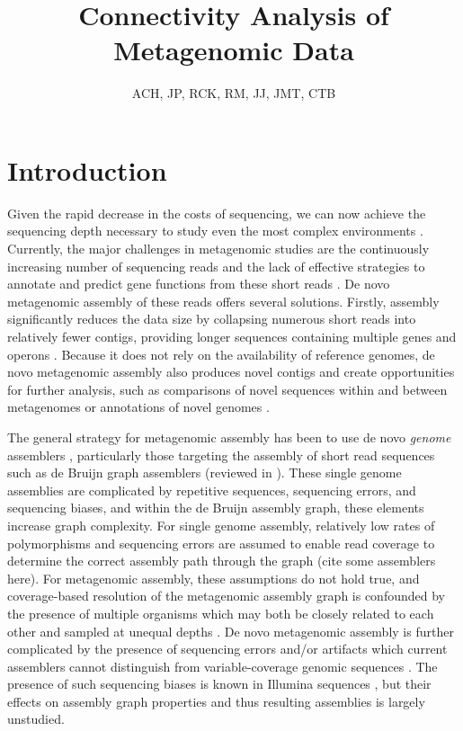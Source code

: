 \documentclass[11pt]{article} %
\begin{document}
\title{Connectivity Analysis of Metagenomic Data}
\author{ACH, JP, RCK, RM, JJ, JMT, CTB}
\maketitle
\section{Introduction}

Given the rapid decrease in the costs of sequencing, we can now achieve the sequencing depth necessary to study even the most complex environments \cite{Hess:2011p686,Qin:2010p189}.  Currently, the major challenges in metagenomic studies are the continuously increasing number of sequencing reads and the lack of effective strategies to annotate and predict gene functions from these short reads \cite{Hoff:2009p913,Kunin:2008p16,Noguchi:2006p968,Zhang:2012p959}.  De novo metagenomic assembly of these reads offers several solutions.  Firstly, assembly significantly reduces the data size by collapsing numerous short reads into relatively fewer contigs, providing longer sequences containing multiple genes and operons \cite{Miller:2010p226,Pop:2009p798}.  Because it does not rely on the availability of reference genomes, de novo metagenomic assembly also produces novel contigs and create opportunities for further analysis, such as comparisons of novel sequences within and between metagenomes \cite{Li:2009p707,Schloss:2008p2} or annotations of novel genomes \cite{Hess:2011p686}.

The general strategy for metagenomic assembly has been to use de novo \emph{genome} assemblers \cite{Hess:2011p686,Qin:2010p189}, particularly those targeting the assembly of short read sequences such as de Bruijn graph assemblers (reviewed in \cite{Miller:2010p226,Pop:2009p798}). These single genome assemblies are complicated by repetitive sequences, sequencing errors, and sequencing biases, and within the de Bruijn assembly graph, these elements increase graph complexity. For single genome assembly, relatively low rates of polymorphisms and sequencing errors are assumed to enable read coverage to determine the correct assembly path through the graph (cite some assemblers here).  For metagenomic assembly, these assumptions do not hold true, and coverage-based resolution of the metagenomic assembly graph is confounded by the presence of multiple organisms which may both be closely related to each other and sampled at unequal depths \cite{Peng:2011p898}.  De novo metagenomic assembly is further complicated by the presence of sequencing errors and/or artifacts which current assemblers cannot distinguish from variable-coverage genomic sequences \cite{Peng:2011p898,Venter:2004p727}.  The presence of such sequencing biases is known in Illumina sequences \cite{Harismendy:2009p228,Hoffmann:2009p1027,Nakamura:2011p741}, but their effects on assembly graph properties and thus resulting assemblies is largely unstudied. 
  
\end{document}

